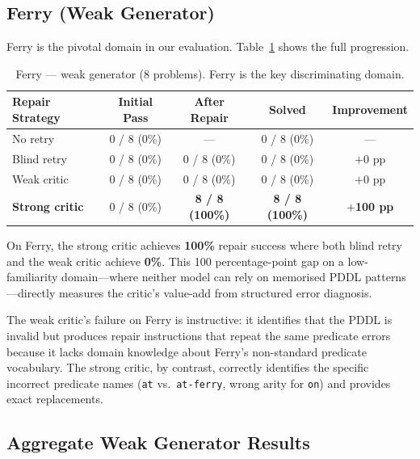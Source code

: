 \documentclass{article}
\begin{document}
\subsection{Ferry (Weak Generator)}
\label{sec:ferry_weak}

Ferry is the pivotal domain in our evaluation.  Table~\ref{tab:ferry_weak} shows
the full progression.

\begin{table}[h]
\centering
\caption{Ferry --- weak generator (8 problems).  Ferry is the key discriminating domain.}
\label{tab:ferry_weak}
\begin{tabular}{lcccc}
\toprule
\textbf{Repair Strategy} & \textbf{Initial Pass} & \textbf{After Repair} & \textbf{Solved} & \textbf{Improvement} \\
\midrule
No retry          & 0 / 8 (0\%)  & ---           & 0 / 8 (0\%)   & ---          \\
Blind retry       & 0 / 8 (0\%)  & 0 / 8 (0\%)   & 0 / 8 (0\%)   & $+$0 pp      \\
Weak critic       & 0 / 8 (0\%)  & 0 / 8 (0\%)   & 0 / 8 (0\%)   & $+$0 pp      \\
\textbf{Strong critic} & 0 / 8 (0\%) & \textbf{8 / 8 (100\%)} & \textbf{8 / 8 (100\%)} & $+$\textbf{100 pp} \\
\bottomrule
\end{tabular}
\end{table}

On Ferry, the strong critic achieves \textbf{100\%} repair success where both blind
retry and the weak critic achieve \textbf{0\%}.  This 100 percentage-point gap on a
low-familiarity domain---where neither model can rely on memorised PDDL
patterns---directly measures the critic's value-add from structured error diagnosis.

The weak critic's failure on Ferry is instructive: it identifies that the PDDL is
invalid but produces repair instructions that repeat the same predicate errors because
it lacks domain knowledge about Ferry's non-standard predicate vocabulary.  The strong
critic, by contrast, correctly identifies the specific incorrect predicate names
(\texttt{at} vs.\ \texttt{at-ferry}, wrong arity for \texttt{on}) and provides
exact replacements.

\subsection{Aggregate Weak Generator Results}
\label{sec:agg_weak}
\end{document}

